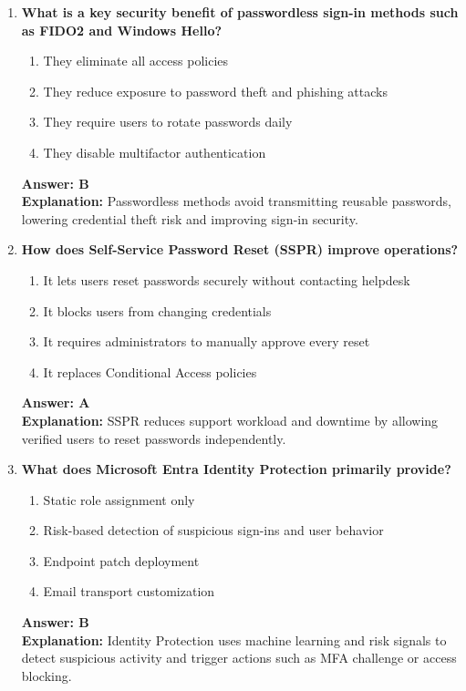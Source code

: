 \documentclass[10pt]{article}
\begin{document}
\begin{enumerate}[leftmargin=*]
\item \textbf{What is a key security benefit of passwordless sign-in methods such as FIDO2 and Windows Hello?}
\begin{enumerate}[label=\Alph*.]
  \item They eliminate all access policies
  \item They reduce exposure to password theft and phishing attacks
  \item They require users to rotate passwords daily
  \item They disable multifactor authentication
\end{enumerate}
\textbf{Answer: B}\\
\textbf{Explanation:} Passwordless methods avoid transmitting reusable passwords, lowering credential theft risk and improving sign-in security.

\item \textbf{How does Self-Service Password Reset (SSPR) improve operations?}
\begin{enumerate}[label=\Alph*.]
  \item It lets users reset passwords securely without contacting helpdesk
  \item It blocks users from changing credentials
  \item It requires administrators to manually approve every reset
  \item It replaces Conditional Access policies
\end{enumerate}
\textbf{Answer: A}\\
\textbf{Explanation:} SSPR reduces support workload and downtime by allowing verified users to reset passwords independently.

\item \textbf{What does Microsoft Entra Identity Protection primarily provide?}
\begin{enumerate}[label=\Alph*.]
  \item Static role assignment only
  \item Risk-based detection of suspicious sign-ins and user behavior
  \item Endpoint patch deployment
  \item Email transport customization
\end{enumerate}
\textbf{Answer: B}\\
\textbf{Explanation:} Identity Protection uses machine learning and risk signals to detect suspicious activity and trigger actions such as MFA challenge or access blocking.


\end{enumerate}
\end{document}
